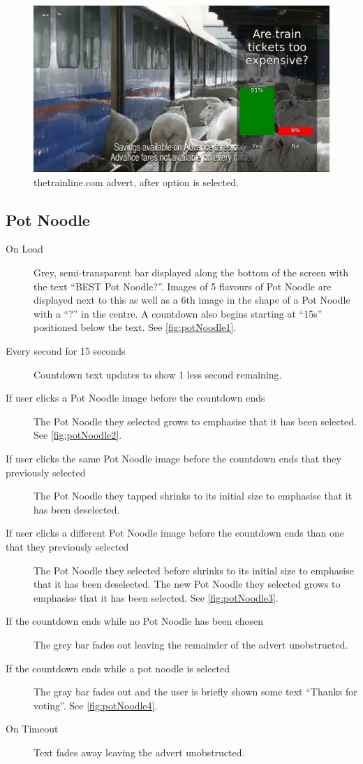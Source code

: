 	\begin{figure}[th]
		\centering
		\includegraphics[width=\textwidth,height=0.5\textheight,keepaspectratio]{images/adverts/trainline-2.png}
		\caption{thetrainline.com advert, after option is selected.}
		\label{fig:trainline2}
	\end{figure}

\clearpage
\subsection{Pot Noodle}
	\begin{description}
		\item[On Load]{Grey, semi-transparent bar displayed along the bottom of the screen with the text ``BEST Pot Noodle?''. Images of 5 flavours of Pot Noodle are displayed next to this as well as a 6th image in the shape of a Pot Noodle with a ``?'' in the centre. A countdown also begins starting at ``15s'' positioned below the text. See \ref{fig:potNoodle1}.}
		\item[Every second for 15 seconds]{Countdown text updates to show 1 less second remaining.}
		\item[If user clicks a Pot Noodle image before the countdown ends]{The Pot Noodle they selected grows to emphasise that it has been selected. See \ref{fig:potNoodle2}.}
		\item[If user clicks the same Pot Noodle image before the countdown ends that they previously selected]{The Pot Noodle they tapped shrinks to its initial size to emphasise that it has been deselected.}
		\item[If user clicks a different Pot Noodle image before the countdown ends than one that they previously selected]{The Pot Noodle they selected before shrinks to its initial size to emphasise that it has been deselected. The new Pot Noodle they selected grows to emphasise that it has been selected. See \ref{fig:potNoodle3}.}
		\item[If the countdown ends while no Pot Noodle has been chosen]{The grey bar fades out leaving the remainder of the advert unobstructed.}
		\item[If the countdown ends while a pot noodle is selected]{The gray bar fades out and the user is briefly shown some text ``Thanks for voting''. See \ref{fig:potNoodle4}.}
		\item[On Timeout]{Text fades away leaving the advert unobstructed.}
	\end{description}

